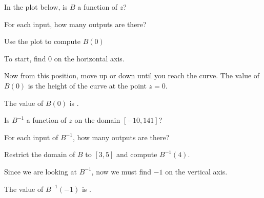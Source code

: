 \begin{question}
In the plot below, is $B$ a function of $z$?


\begin{image}
\end{image}
\begin{multiple-choice}
\end{multiple-choice}
\begin{solution}
\begin{hint}
For each input, how many outputs are there?
\end{hint}
\end{solution}
Use the plot to compute $B(0)$
\begin{solution}
\begin{hint}
To start, find $0$ on the horizontal axis. 
\end{hint}
\begin{hint}
Now from this position, move up or down until you reach the curve. The value of $B(0)$ is the height of the curve at the point $z=0$.
\end{hint}
The value of $B(0)$ is .
\end{solution}
Is $B^{-1}$ a function of $z$ on the domain $[-10,141]$?
\begin{multiple-choice}
\end{multiple-choice}
\begin{solution}
\begin{hint}
For each input of $B^{-1}$, how many outputs are there?
\end{hint}
\end{solution}
Restrict the domain of $B$ to $[3,5]$ and compute $B^{-1}(4)$.
\begin{solution}
\begin{hint}
Since we are looking at $B^{-1}$, now we must find $-1$ on the vertical axis. 
\end{hint}
The value of $B^{-1}(-1)$ is .
\end{solution}
\end{question}



